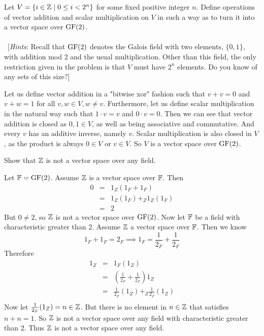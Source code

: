 \begin{problem}[Golan 63]

Let $V = \{ i \in \mathbb{Z} \mid 0 \leq i < 2^n \}$ for some fixed positive integer
$n$.  Define operations of vector addition and scalar multiplication on $V$ in
such a way as to turn it into a vector space over $\operatorname{GF}(2)$.\\
\\
~[{\it Hints}: Recall that $\operatorname{GF}(2)$ denotes the Galois field with two elements,
  $\{0, 1\}$, with addition mod 2 and the usual multiplication.
  Other than this field, the only restriction given in the
  problem is that $V$ must have $2^n$ elements. Do you know of any sets of this size?]
\end{problem}
\smallskip
\begin{solution}
Let us define vector addition in a "bitwise xor" fashion such that $v + v = 0$ and $v + w = 1$ for all $v,w \in V, w \neq v$. Furthermore, let us define scalar multiplication in the natural way such that $1\cdot v = v$ and $0\cdot v = 0$.  Then we can see that vector addition is closed as $0,1 \in V$, as well as being associative and commutative. And every $v$ has an additive inverse, namely $v$. Scalar multiplication is also closed in $V$, as the product is always $0 \in V$ or $v \in V$. So $V$ is a vector space over $\operatorname{GF}(2)$. 
\end{solution}
\probskip

\begin{ProbBox}  
\newcommand{\F}{\fld{F}}
\begin{problem}[Golan 70]
Show that $\mathbb{Z}$ is not a vector space over any field.
\end{problem}
\smallskip
\begin{solution}
Let $\mathbb{F} = \operatorname{GF}(2)$. Assume $\mathbb{Z}$ is a vector space over $\F$. Then
\begin{eqnarray*}
0 & = & 1_Z(1_F + 1_F) \\
  & = & 1_Z(1_{F})+_Z 1_Z(1_F) \\
  & = & 2 
\end{eqnarray*}
But $0 \neq 2$, so $\mathbb{Z}$ is not a vector space over $\operatorname{GF}(2)$. Now let $\F$ be a field with characteristic greater than 2. Assume $\mathbb{Z}$ a vector space over $\F$. Then we know
$$ 1_F + 1_F = 2_F \implies 1_F = \frac{1}{2_F} + \frac{1}{2_F}$$
Therefore
\begin{eqnarray*}
1_Z & = & 1_F(1_Z) \\
	& = & (\frac{1}{2_F} + \frac{1}{2_F})1_Z \\
	& = & \frac{1}{2_F}(1_Z) +_Z \frac{1}{2_F}(1_Z) \\
\end{eqnarray*}
Now let $\frac{1}{2_F}(1_Z) = n \in \mathbb{Z}$.  But there is no element in $n \in \mathbb{Z}$ that satisfies $n + n = 1$. So $\mathbb{Z}$ is not a vector space over any field with characteristic greater than 2. Thus $\mathbb{Z}$ is not a vector space over any field. 
\end{solution}
\probskip
\end{ProbBox}


